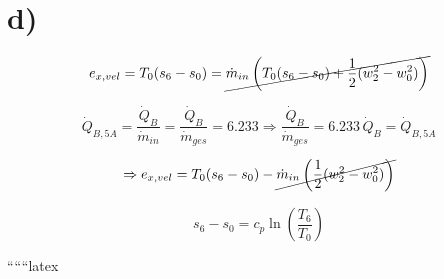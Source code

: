 

\section*{d)}

\[ e_{x,vel} = T_{0} (s_{6} - s_{0}) = \cancel{\dot{m}_{in} \left( T_{0} (s_{6} - s_{0}) + \frac{1}{2} (w_{2}^{2} - w_{0}^{2}) \right)} \]

\[ \dot{Q}_{B,5A} = \frac{\dot{Q}_{B}}{\dot{m}_{in}} = \frac{\dot{Q}_{B}}{\dot{m}_{ges}} = 6.233 \Rightarrow \frac{\dot{Q}_{B}}{\dot{m}_{ges}} = 6.233 \, \dot{Q}_{B} = \dot{Q}_{B,5A} \]

\[ \Rightarrow e_{x,vel} = T_{0} (s_{6} - s_{0}) - \cancel{\dot{m}_{in} \left( \frac{1}{2} (w_{2}^{2} - w_{0}^{2}) \right)} \]

\[ s_{6} - s_{0} = c_{p} \ln \left( \frac{T_{6}}{T_{0}} \right) \]

``````latex